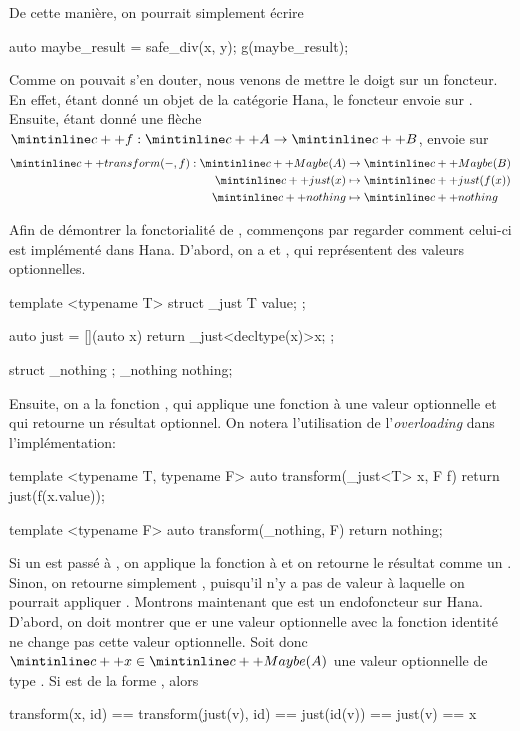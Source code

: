 De cette manière, on pourrait simplement écrire
\begin{cpp}
    auto maybe_result = safe_div(x, y);
    g(maybe_result);
\end{cpp}

Comme on pouvait s'en douter, nous venons de mettre le doigt sur un foncteur.
En effet, étant donné un objet  de la catégorie Hana, le foncteur
 envoie  sur . Ensuite, étant donné une flèche
$\cc{f} : \cc{A} \to \cc{B}$,  envoie  sur
\begin{align*}
    \cc{transform(-, f)} : \cc{Maybe(A)} &\to \cc{Maybe(B)}             \\
                           \cc{just(x)} &\mapsto \cc{just(f(x))}        \\
                           \cc{nothing} &\mapsto \cc{nothing}
\end{align*}

Afin de démontrer la fonctorialité de , commençons par regarder
comment celui-ci est implémenté dans Hana. D'abord, on a  et
, qui représentent des valeurs optionnelles.
\begin{cpp}
    template <typename T>
    struct _just { T value; };

    auto just = [](auto x) {
        return _just<decltype(x)>{x};
    };

    struct _nothing { };
    _nothing nothing{};
\end{cpp}

Ensuite, on a la fonction , qui applique une fonction à une
valeur optionnelle et qui retourne un résultat optionnel. On notera
l'utilisation de l'\textit{overloading} dans l'implémentation:
\begin{cpp}
    template <typename T, typename F>
    auto transform(_just<T> x, F f) {
        return just(f(x.value));
    }

    template <typename F>
    auto transform(_nothing, F) {
        return nothing;
    }
\end{cpp}

Si un  est passé à , on applique la fonction
 à  et on retourne le résultat comme un . Sinon,
on retourne simplement , puisqu'il n'y a pas de valeur à
laquelle on pourrait appliquer . Montrons maintenant que 
est un endofoncteur sur Hana. D'abord, on doit montrer que er
une valeur optionnelle avec la fonction identité ne change pas cette valeur
optionnelle. Soit donc $\cc{x} \in \cc{Maybe(A)}$ une valeur optionnelle de
type . Si  est de la forme , alors
\begin{cpp}
    transform(x, id) == transform(just(v), id)
                     == just(id(v))
                     == just(v)
                     == x
\end{cpp}

